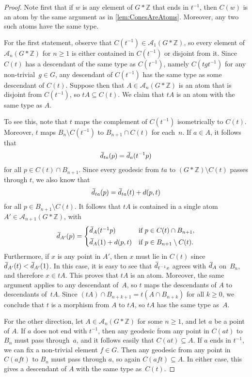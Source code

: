\documentclass[11pt,letterpaper]{amsart}
\theoremstyle{definition}
\newcommand{\Z}{\mathbb{Z}}
\newcommand{\A}{\mathcal{A}}
\newcommand{\od}{\mkern 3mu\overline{\mkern-3mu d\mkern 1.5mu}\mkern-1.5mu}
\begin{document}
\begin{proof}
Note first that if $w$ is any element of $G*\Z$ that ends in $t^{-1}$, then  $C(w)$ is an atom by the same argument as in \cref{lem:ConesAreAtoms}.  Moreover, any two such atoms have the same type.

For the first statement, observe that $C(t^{-1})\in \A_1(G*\Z)$, so every element of $\A_n(G*\Z)$ for $n\geq 1$ is either contained in $C(t^{-1})$ or disjoint from it.  Since $C(t)$ has a descendant of the same type as $C(t^{-1})$, namely $C(tgt^{-1})$ for any non-trivial~$g\in G$, any descendant of $C(t^{-1})$ has the same type as some descendant of $C(t)$.  Suppose then that $A\in\A_n(G*\Z)$ is an atom that is disjoint from $C(t^{-1})$, so $tA\subseteq C(t)$.  We claim that $tA$ is an atom with the same type as $A$.

To see this, note that $t$ maps the complement of $C(t^{-1})$ isometrically to $C(t)$.  Moreover, $t$ maps $B_n\setminus C(t^{-1})$ to $B_{n+1}\cap C(t)$ for each~$n$.  If $a\in A$, it follows that
\[
\od_{ta}(p) = \od_{a}(t^{-1}p)
\]
for all $p\in C(t)\cap B_{n+1}$.  Since every geodesic from $ta$ to $(G*\Z)\setminus C(t)$ passes through $t$, we also know that
\[
\od_{ta}(p) = \od_{ta}(t) + d(p,t)
\]
for all $p\in B_{n+1}\setminus C(t)$.  It follows that $tA$ is contained in a single atom $A'\in\A_{n+1}(G*\Z)$, with
\[
\od_{A'}(p)=\begin{cases}\od_A(t^{-1}p) & \text{if }p\in C(t)\cap B_{n+1}, \\[3pt] \od_A(1) + d(p,t) & \text{if }p\in B_{n+1}\setminus C(t).\end{cases}
\]
Furthermore, if $x$ is any point in $A'$, then $x$ must lie in $C(t)$ since $\od_{A'}(t)<\od_{A'}(1)$.  In this case, it is easy to see that $\od_{t^{-1}x}$ agrees with $\od_A$ on~$B_n$, and therefore $x\in tA$.  This proves that $tA$ is an atom.  Moreover, the same argument applies to any descendant of~$A$, so $t$ maps the descendants of $A$ to descendants of~$tA$.  Since $(tA)\cap B_{n+k+1} = t(A\cap B_{n+k})$ for all $k\geq 0$, we conclude that $t$ is a morphism from $A$ to $tA$, so $tA$ has the same type as~$A$.

For the other direction, let $A\in\A_n(G*\Z)$ for some $n\geq 1$, and let $a$ be a point of $A$.  If $a$ does not end with $t^{-1}$,  then any geodesic from any point in $C(at)$ to $B_n$ must pass through~$a$, and it follows easily that $C(at)\subseteq A$.  If $a$ ends in $t^{-1}$, we can fix a non-trivial element $f\in G$.  Then any geodesic from any point in $C(aft)$ to $B_n$ must pass through $a$, so again $C(aft)\subseteq A$.  In either case, this gives a descendant of $A$ with the same type as~$C(t)$.
\end{proof}
\end{document}
